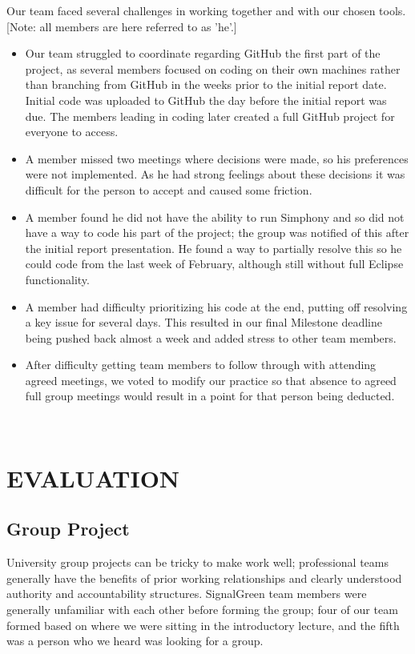 \documentclass[11pt]{article}
\begin{document}
\begin{enumerate}
Our team faced several challenges in working together and with our chosen tools. [Note: all members are here referred to as \textquoteright he\textquoteright .] 

\begin{itemize}\itemsep0pt
\item Our team struggled to coordinate regarding GitHub the first part of the project, as several members focused on coding on their own machines rather than branching from GitHub in the weeks prior to the initial report date. Initial code was uploaded to GitHub the day before the initial report was due. The members leading in coding later created a full GitHub project for everyone to access. 
\item A member missed two meetings where decisions were made, so his preferences were not implemented. As he had strong feelings about these decisions it was difficult for the person to accept and caused some friction.
\item A member found he did not have the ability to run Simphony and so did not have a way to code his part of the project; the group was notified of this after the initial report presentation. He found a way to partially resolve this so he could code from the last week of February, although still without full Eclipse functionality. 
\item A member had difficulty prioritizing his code at the end, putting off resolving a key issue for several days. This resulted in our final Milestone deadline being pushed back almost a week and added stress to other team members.
\item After difficulty getting team members to follow through with attending agreed meetings, we voted to modify our practice so that absence to agreed full group meetings would result in a point for that person being deducted.
\end{itemize}
\\


\section{EVALUATION}


\subsection{Group Project}

University group projects can be tricky to make work well; professional teams generally have the benefits of prior working relationships and clearly understood authority and accountability structures. SignalGreen team members were generally unfamiliar with each other before forming the group; four of our team formed based on where we were sitting in the introductory lecture, and the fifth was a person who we heard was looking for a group. 


\end{enumerate}
\end{document}
